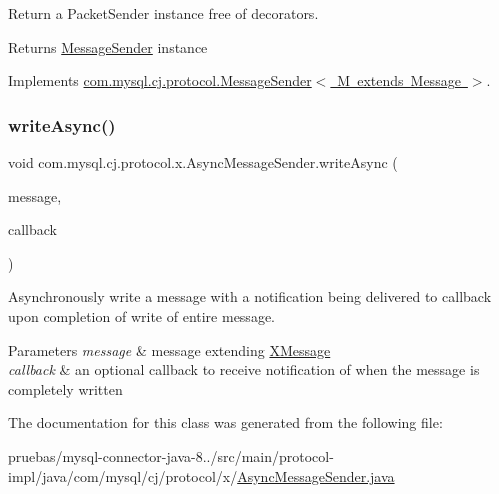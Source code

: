 Return a Packet\+Sender instance free of decorators.

\begin{DoxyReturn}{Returns}
\mbox{\hyperlink{interfacecom_1_1mysql_1_1cj_1_1protocol_1_1_message_sender}{Message\+Sender}} instance 
\end{DoxyReturn}


Implements \mbox{\hyperlink{interfacecom_1_1mysql_1_1cj_1_1protocol_1_1_message_sender_a8066931f03c2fa9cc705716fa10a4517}{com.\+mysql.\+cj.\+protocol.\+Message\+Sender$<$ M extends Message $>$}}.

\mbox{\label{classcom_1_1mysql_1_1cj_1_1protocol_1_1x_1_1_async_message_sender_a405a11dfc5f673ba7e8dbb1410bf25f9}} 
\subsubsection{\texorpdfstring{write\+Async()}{writeAsync()}}
{\footnotesize\ttfamily void com.\+mysql.\+cj.\+protocol.\+x.\+Async\+Message\+Sender.\+write\+Async (\begin{DoxyParamCaption}\item[{\mbox{\hyperlink{classcom_1_1mysql_1_1cj_1_1protocol_1_1x_1_1_x_message}{X\+Message}}}]{message,  }\item[{Completion\+Handler$<$ Long, Void $>$}]{callback }\end{DoxyParamCaption})}

Asynchronously write a message with a notification being delivered to {\ttfamily callback} upon completion of write of entire message.


\begin{DoxyParams}{Parameters}
{\em message} & message extending \mbox{\hyperlink{classcom_1_1mysql_1_1cj_1_1protocol_1_1x_1_1_x_message}{X\+Message}} \\
\hline
{\em callback} & an optional callback to receive notification of when the message is completely written \\
\hline
\end{DoxyParams}


The documentation for this class was generated from the following file\+:\begin{DoxyCompactItemize}
\item 
pruebas/mysql-\/connector-\/java-\/8../src/main/protocol-\/impl/java/com/mysql/cj/protocol/x/\mbox{\hyperlink{_async_message_sender_8java}{Async\+Message\+Sender.\+java}}\end{DoxyCompactItemize}
